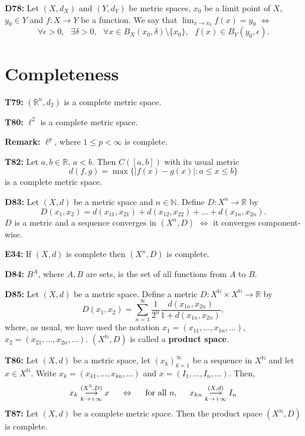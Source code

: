\documentclass[twocolumn,10pt]{article}
\begin{document}
\textbf{D78:} Let $(X,d_X)$ and $(Y,d_Y)$ be metric spaces, $x_0$ be a limit point of $X$, $y_0\in Y$ and $f:X\to Y$ be a function. We say that $\lim_{x\to x_0}f(x)=y_0$ $\Leftrightarrow$
\begin{equation*}
    \forall\epsilon>0, \text{ } \exists\delta>0, \text{ } \forall x\in B_X(x_0,\delta)\setminus\{x_0\}, \text{ } f(x)\in B_Y(y_0,\epsilon).
\end{equation*}

\section{Completeness}

\textbf{T79:} $(\mathbb{R}^n,d_2)$ is a complete metric space.


\textbf{T80:} $\ell^2$ is a complete metric space.

\textbf{Remark:} $\ell^p$, where $1\leq p<\infty$ is complete.

\textbf{T82:} Let $a,b\in\mathbb{R}$, $a<b$. Then $C([a,b])$ with its usual metric
\begin{equation*}
    d(f,g) = \max\{|f(x)-g(x)| : a\leq x\leq b\}
\end{equation*}
is a complete metric space.

\textbf{D83:} Let $(X,d)$ be a metric space and $n\in\mathbb{N}$. Define $D:X^n\to\mathbb{R}$ by
\begin{equation*}
    D(x_1,x_2) = d(x_{11},x_{21}) + d(x_{12},x_{22}) + ... + d(x_{1n},x_{2n}).
\end{equation*}
$D$ is a metric and a sequence converges in $(X^n,D)$ $\Leftrightarrow$ it converges component-wise.

\textbf{E34:} If $(X,d)$ is complete then $(X^n,D)$ is complete.

\textbf{D84:} $B^A$, where $A,B$ are sets, is the set of all functions from $A$ to $B$.

\textbf{D85:} Let $(X,d)$ be a metric space. Define a metric $D:X^{\mathbb{N}}\times X^{\mathbb{N}}\to\mathbb{R}$ by
\begin{equation*}
    D(x_1,x_2) = \sum_{n=1}^{\infty} \frac{1}{2^n}\frac{d(x_{1n},x_{2n})}{1+d(x_{1n},x_{2n})},
\end{equation*}
where, as usual, we have used the notation $x_1=(x_{11},...,x_{1n},...)$, $x_2=(x_{21},...,x_{2n},...)$. $(X^{\mathbb{N}},D)$ is called a \textbf{product space}.

\textbf{T86:} Let $(X,d)$ be a metric space, let $(x_k)_{k=1}^{\infty}$ be a sequence in $X^{\mathbb{N}}$ and let $x\in X^{\mathbb{N}}$. Write $x_k=(x_{k1},...,x_{kn},...)$ and $x=(I_1,...,I_n,...)$. Then,
\begin{equation*}
    x_k \underset{k\to+\infty}{\overset{(X^{\mathbb{N}},D)}{\longrightarrow}} x \hspace{0.5cm}\Leftrightarrow\hspace{0.5cm} \text{for all } n, \hspace{0.5cm} x_{kn} \underset{k\to+\infty}{\overset{(X,d)}{\longrightarrow}} I_n
\end{equation*}
\textbf{T87:} Let $(X,d)$ be a complete metric space. Then the product space $(X^{\mathbb{N}},D)$ is complete.
\end{document}
